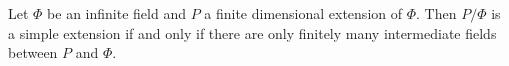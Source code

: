 Let $\Phi$ be an infinite field and $P$ a finite dimensional extension of $\Phi$. Then $P/\Phi$ is a simple extension if and only if there are only finitely many intermediate fields between $P$ and $\Phi$.
